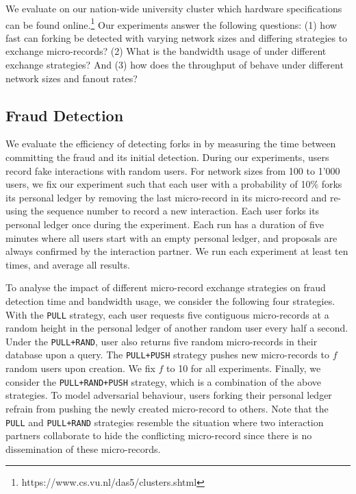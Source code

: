 We evaluate \ModelName{} on our nation-wide university cluster which hardware specifications can be found online.\footnote{https://www.cs.vu.nl/das5/clusters.shtml}
Our experiments answer the following questions: (1) how fast can forking be detected with varying network sizes and differing strategies to exchange micro-records? (2) What is the bandwidth usage of \ModelName{} under different exchange strategies? And (3) how does the throughput of \ModelName{} behave under different network sizes and fanout rates?

\subsection{Fraud Detection}
\label{sec:fraud_detection_experiment}
We evaluate the efficiency of detecting forks in \ModelName{} by measuring the time between committing the fraud and its initial detection.
During our experiments, users record fake interactions with random users.
For network sizes from 100 to 1'000 users, we fix our experiment such that each user with a probability of 10\% forks its personal ledger by removing the last micro-record in its micro-record and re-using the sequence number to record a new interaction.
Each user forks its personal ledger once during the experiment.
Each run has a duration of five minutes where all users start with an empty personal ledger, and proposals are always confirmed by the interaction partner.
We run each experiment at least ten times, and average all results.


To analyse the impact of different micro-record exchange strategies on fraud detection time and bandwidth usage, we consider the following four strategies.
With the \texttt{PULL} strategy, each user requests five contiguous micro-records at a random height in the personal ledger of another random user every half a second.
Under the \texttt{PULL+RAND}, user also returns five random micro-records in their database upon a query.
The \texttt{PULL+PUSH} strategy pushes new micro-records to $ f $ random users upon creation.
We fix $ f $ to 10 for all experiments.
Finally, we consider the \texttt{PULL+RAND+PUSH} strategy, which is a combination of the above strategies.
To model adversarial behaviour, users forking their personal ledger refrain from pushing the newly created micro-record to others.
Note that the \texttt{PULL} and \texttt{PULL+RAND} strategies resemble the situation where two interaction partners collaborate to hide the conflicting micro-record since there is no dissemination of these micro-records.

